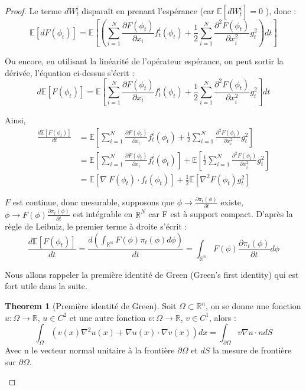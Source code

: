 \documentclass[a4paper,10pt]{article}
\theoremstyle{definition} %
\theoremstyle{definition} %
\theoremstyle{definition} %
\newtheorem{theorem}[definition]{Theorem}
\theoremstyle{definition} %
\newcommand{\E}[1]{\mathbb{E}\left[#1\right]}
\newcommand{\R}{\mathbb{R}}
\begin{document}
\begin{proof}
Le terme $dW_t^i$ disparaît en prenant l'espérance  (car $\mathbb{E}[dW_t^i] = 0$ ), donc :
\[\E{dF(\phi_t)} = \E{\left(\sum\limits_{i=1}^N \frac{\partial F(\phi_t)}{\partial x_i} f^i_t(\phi_t) + \frac{1}{2} \sum\limits_{i=1}^N \frac{\partial^2 F(\phi_t)}{\partial x_i^2} g_t^2\right)dt}\]

Ou encore, en utilisant la linéarité de l'opérateur espérance, on peut sortir la dérivée, l'équation ci-dessus s'écrit :
\[ d\E{F(\phi_t)} = \E{\sum\limits_{i=1}^N \frac{\partial F(\phi_t)}{\partial x_i} f^i_t(\phi_t) + \frac{1}{2} \sum\limits_{i=1}^N \frac{\partial^2 F(\phi_t)}{\partial x_i^2} g_t^2}dt\]

Ainsi,
\begin{align}
    \frac{d\E{F(\phi_t)}}{dt} &= \E{\sum\limits_{i=1}^N \frac{\partial F(\phi_t)}{\partial x_i} f^i_t(\phi_t) + \frac{1}{2} \sum\limits_{i=1}^N  \frac{\partial^2 F(\phi_t)}{\partial x_i^2}g_t^2} \nonumber \\
    &=\E{\sum\limits_{i=1}^N \frac{\partial F(\phi_t)}{\partial x_i} f^i_t(\phi_t)} + \E{\frac{1}{2} \sum\limits_{i=1}^N  \frac{\partial^2 F(\phi_t)}{\partial x_i^2} g_t^2} \nonumber\\
    &=\E{ \nabla\ F(\phi_t) \cdot f_t(\phi_t)} + \frac{1}{2}\E{\nabla^2 F(\phi_t) g_t^2} \label{eq:EsperanceEgality}
\end{align}

$F$ est continue, donc mesurable, supposons que $\phi \rightarrow \frac{\partial\pi_t(\phi)}{\partial t}$ existe, $\phi \rightarrow F(\phi)\frac{\partial\pi_t(\phi)}{\partial t}$ est intégrable en $\R^N$ car F est à support compact. D'après la règle de Leibniz, le premier terme à droite s'écrit :
\[\frac{d\mathbb{E}[F(\phi_t)]}{dt} = \frac{d (\int_{\mathbb{R^N}} F(\phi) \pi_t(\phi) d\phi)} {dt} = \int_{\mathbb{R^N}}F(\phi)\frac{\partial\pi_t(\phi)}{\partial t} d\phi\]
\vspace{2em}

Nous allons rappeler la première identité de Green (Green's first identity) qui est fort utile dans la suite.

\begin{theorem}[Première identité de Green]
Soit $\Omega \subset \R^n$, on se donne une fonction $u : \Omega \rightarrow \R$, $u \in C^2$ et une autre fonction $v : \Omega \rightarrow \R$, $v \in C^1$, alors :
\begin{equation}\label{eq:GreenId}
\int_\Omega (v(x)\nabla^2 u(x) + \nabla u(x) \cdot \nabla v(x)) dx = \int_{\partial\Omega} v \nabla u \cdot n dS
\end{equation}
Avec n le vecteur normal unitaire à la frontière $\partial\Omega$ et $dS$ la mesure de frontière sur $\partial\Omega$.
\end{theorem}
\vspace{3em}


\end{proof}
\end{document}
